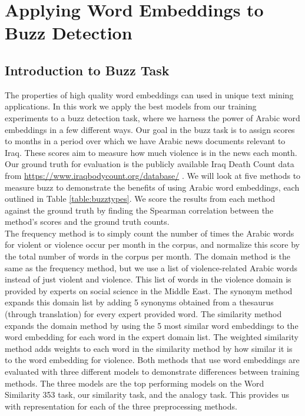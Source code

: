 \chapter{Applying Word Embeddings to Buzz Detection}
\label{sec:buzz}

\section{Introduction to Buzz Task}

The properties of high quality word embeddings can used in unique text mining applications. In this work we apply the best models from our training experiments to a buzz detection task, where we harness the power of Arabic word embeddings in a few different ways. Our goal in the buzz task is to assign scores to months in a period over which we have Arabic news documents relevant to Iraq. These scores aim to measure how much violence is in the news each month. Our ground truth for evaluation is the publicly available Iraq Death Count data from \url{https://www.iraqbodycount.org/database/} \cite{IraqB68:online}. We will look at five methods to measure buzz to demonstrate the benefits of using Arabic word embeddings, each outlined in Table \ref{table:buzztypes}.  We score the results from each method against the ground truth by finding the Spearman correlation between the method's scores and the ground truth counts. 
\\
The frequency method is to simply count the number of times the Arabic words for violent or violence occur per month in the corpus, and normalize this score by the total number of words in the corpus per month. The domain method is the same as the frequency method, but we use a list of violence-related Arabic words instead of just violent and violence. This list of words in the violence domain is provided by experts on social science in the Middle East. The synonym method expands this domain list by adding 5 synonyms obtained from a thesaurus (through translation) for every expert provided word. The similarity method expands the domain method by using the 5 most similar word embeddings to the word embedding for each word in the expert domain list. The weighted similarity method adds weights to each word in the similarity method by how similar it is to the word embedding for violence. Both methods that use word embeddings are evaluated with three different models to demonstrate differences between training methods. The three models are the top performing models on the Word Similarity 353 task, our similarity task, and the analogy task. This provides us with representation for each of the three preprocessing methods.

